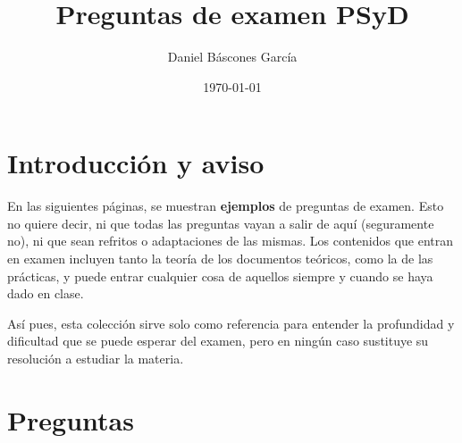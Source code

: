 \documentclass[svgnames,spanish,11pt,a4paper]{article}
\title{Preguntas de examen PSyD}
\author{Daniel Báscones García}
\date{\today}
\begin{document}
\setlength{\parskip}{0em}
\maketitle
\tableofcontents
\setlength{\parskip}{1em}


\section{Introducción y aviso}

    En las siguientes páginas, se muestran \textbf{ejemplos} de preguntas de examen. Esto no quiere decir, ni que todas las preguntas vayan a salir de aquí (seguramente no), ni que sean refritos o adaptaciones de las mismas. Los contenidos que entran en examen incluyen tanto la teoría de los documentos teóricos, como la de las prácticas, y puede entrar cualquier cosa de aquellos siempre y cuando se haya dado en clase.

    Así pues, esta colección sirve solo como referencia para entender la profundidad y dificultad que se puede esperar del examen, pero en ningún caso sustituye su resolución a estudiar la materia.

\section{Preguntas}
\end{document}
